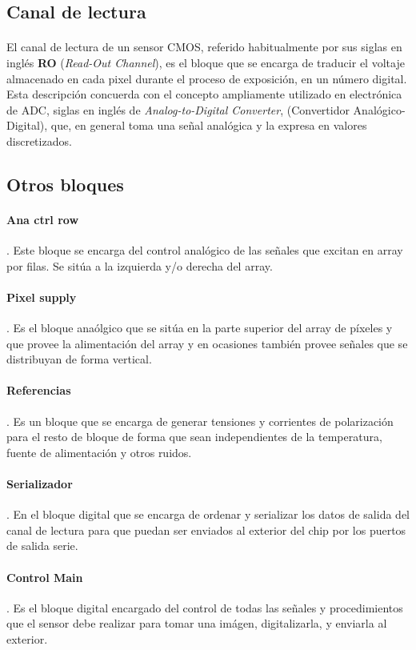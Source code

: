 \subsection{Canal de lectura}
\paragraph{}
El canal de lectura de un sensor CMOS, referido habitualmente por sus
siglas en inglés \textbf{RO} (\textit{Read-Out Channel}), es el bloque que se
encarga de traducir el voltaje almacenado en cada pixel durante el proceso
de exposición, en un número digital. Esta descripción concuerda con el concepto
ampliamente utilizado en electrónica de ADC, siglas en inglés de \textit{Analog-to-Digital
Converter}, (Convertidor Analógico-Digital), que, en general toma una señal
analógica y la expresa en valores discretizados.

\subsection{Otros bloques}
\paragraph{Ana ctrl row}. Este bloque se encarga del control analógico de las
señales que excitan en array por filas. Se sitúa a la izquierda y/o derecha del
array.

\paragraph{Pixel supply}. Es el bloque anaólgico que se sitúa en la parte superior
del array de píxeles y que provee la alimentación del array
y en ocasiones también provee señales que se distribuyan de forma vertical.

\paragraph{Referencias}. Es un bloque que se encarga de generar tensiones y corrientes
de polarización para el resto de bloque de forma que sean independientes de la
temperatura, fuente de alimentación y otros ruidos.

\paragraph{Serializador}. En el bloque digital que se encarga de ordenar y serializar
los datos de salida del canal de lectura para que puedan ser enviados al exterior del
chip por los puertos de salida serie.

\paragraph{Control Main}. Es el bloque digital encargado del control de todas las
señales y procedimientos que el sensor debe realizar para tomar una imágen, digitalizarla,
y enviarla al exterior.

